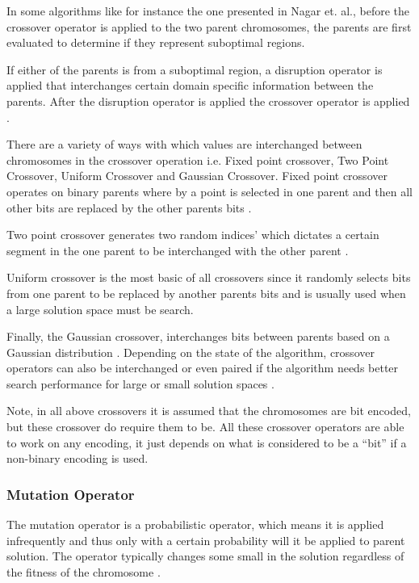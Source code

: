 In some algorithms like for instance the one presented in Nagar et. al., before the crossover operator is applied to the two parent chromosomes, the parents are first evaluated to determine if they represent suboptimal regions\cite{CombinedBranchBoundGA}.

If either of the parents is from a suboptimal region, a disruption operator is applied that interchanges certain domain specific information between the parents. After the disruption operator is applied the crossover operator is applied \cite{CombinedBranchBoundGA}.

There are a variety of ways with which values are interchanged between chromosomes in the crossover operation i.e. Fixed point crossover, Two Point Crossover, Uniform Crossover and Gaussian Crossover. Fixed point crossover operates on binary parents where by a point is selected in one parent and then all other bits are replaced by the other parents bits \cite{HumanPassiveGA}. 

Two point crossover generates two random indices' which dictates a certain segment in the one parent to be interchanged with the other parent \cite{ConstrainedGA}. 

Uniform crossover is the most basic of all crossovers since it randomly selects bits from one parent to be replaced by another parents bits and is usually used when a large solution space must be search\cite{ParallelGASA,GeostatisticalGA}. 

Finally, the Gaussian crossover, interchanges bits between parents based on a Gaussian distribution \cite{ParallelGASA,GeostatisticalGA}. Depending on the state of the algorithm, crossover operators can also be interchanged or even paired if the algorithm needs better search performance for large or small solution spaces \cite{HetergeneousGA,ParallelGASA}.

Note, in all above crossovers it is assumed that the chromosomes are bit encoded, but these crossover do require them to be. All these crossover operators are able to work on any encoding, it just depends on what is considered to be a ``bit'' if a non-binary encoding is used. 

\subsubsection{Mutation Operator}
The mutation operator is a probabilistic operator, which means it is applied infrequently and thus only with a certain probability will it be applied to parent solution. The operator typically changes some small in the solution regardless of the fitness of the chromosome \cite{HybridBaldwinGA,HumanPassiveGA}.

